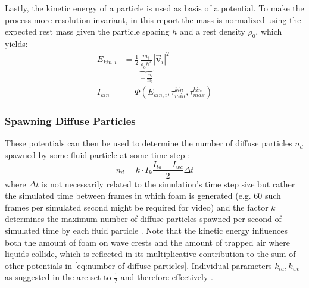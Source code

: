 \documentclass[oneside, a4paper]{book}
\newcommand\abs[1]{\left|#1\right|}
\newcommand\vek[1]{\vec{\bm{#1}}}
\begin{document}
  Lastly, the kinetic energy of a particle is used as basis of a potential. To make the process more resolution-invariant, in this report the mass is normalized using the expected rest mass given the particle spacing $h$ and a rest density $\rho_0$, which yields:
  \begin{align}\label{eq:foam-kinetic-energy}
    E_{kin,i} &= \frac{1}{2} \underbrace{\frac{m_i}{\rho_0 h^3}}_{=\frac{m_i}{m_0}} \abs{\vek{v}_i}^2\\
    I_{kin} &= \Phi(E_{kin,i},\tau_{min}^{kin}, \tau_{max}^{kin})
  \end{align}

  \subsubsection{Spawning Diffuse Particles}
  These potentials can then be used to determine the number of diffuse particles $n_d$ spawned by some fluid particle at some time step \autocite{turbulent-micropolar-foam}:
  \begin{equation}\label{eq:number-of-diffuse-particles}
    n_d = k \cdot I_k \frac{I_{ta}+I_{wc}}{2} \Delta t
  \end{equation}
  where $\Delta t$ is not necessarily related to the simulation's time step size but rather the simulated time between frames in which foam is generated (e.g. $60$ such frames per simulated second might be required for video) and the factor $k$ determines the maximum number of diffuse particles spawned per second of simulated time by each fluid particle \autocite{turbulent-micropolar-foam}. Note that the kinetic energy influences both the amount of foam on wave crests and the amount of trapped air where liquids collide, which is reflected in its multiplicative contribution to the sum of other potentials in \autoref{eq:number-of-diffuse-particles}. Individual parameters $k_{ta}, k_{wc}$ as suggested in the \autocite[original paper]{spray-foam-bubbles} are set to $\frac{1}{2}$ and therefore effectively \autocite[foregone, as later suggested]{turbulent-micropolar-foam}.
\end{document}
